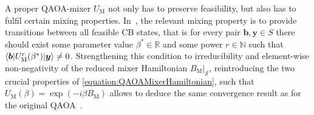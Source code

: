 \documentclass[10pt,conference]{IEEEtran}
\newcommand*{\N}{\mathbb{N}}          %
\newcommand*{\R}{\mathbb{R}}          %
\newcommand*{\solset}{S}              %
\newcommand*{\solspace}{\mathcal{S}}  %
\newcommand*{\mixeru}{U_{\text{M}}}   %
\begin{document}
A proper QAOA-mixer $\mixeru$ not only has to preserve feasibility, but also has to fulfil certain mixing properties.
In~\cite{Hadfield2019FromTheQuantumApproximateOptimizationAlgorithmToAQuantumAlternatingOperatorAnsatz}, the relevant mixing property is to provide transitions between all feasible CB states, that is for every pair $\bm{b}, \bm{y} \in \solset$ there should exist some parameter value $\beta^{*} \in \R$ and some power $r \in \N$ such that $\braket{\bm{b} | \mixeru^{r}(\beta^{*}) | \bm{y}} \neq 0$.
Strengthening this condition to irreducibility and element-wise non-negativity of the reduced mixer Hamiltonian $B_{\text{M}}\vert_{\solspace}$, reintroducing the two crucial properties of \eqref{equation:QAOAMixerHamiltonian}, such that $\mixeru(\beta) = \exp(-i \beta B_{\text{M}})$ allows to deduce the same convergence result as for the original QAOA~\cite{Binkowski2024ElementaryProofOfQaoaConvergence}.
\end{document}
